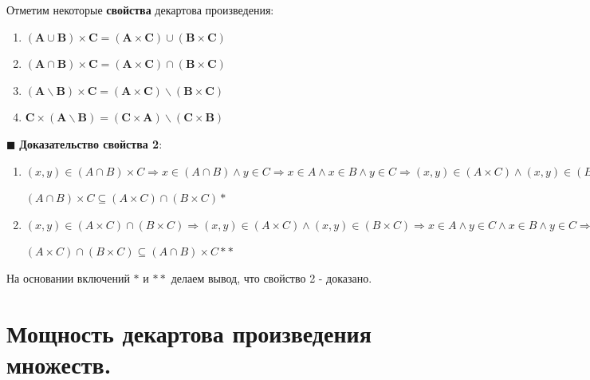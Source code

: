 \documentclass[12pt, a4paper, oneside]{article}
\theoremstyle{plain} %
\theoremstyle{definition}
\begin{document}
Отметим некоторые \textbf{свойства} декартова произведения:

\begin{enumerate}
    
    \item \((\textbf{A} \cup \textbf{B}) \times \textbf{C} = (\textbf{A} \times \textbf{C}) \cup (\textbf{B} \times \textbf{C})\)
    
    \item \((\textbf{A} \cap \textbf{B}) \times \textbf{C} = (\textbf{A} \times \textbf{C}) \cap (\textbf{B} \times \textbf{C})\)
    
    \item \((\textbf{A} \backslash \textbf{B}) \times \textbf{C} = (\textbf{A} \times \textbf{C}) \backslash (\textbf{B} \times \textbf{C})\)
    
    \item \(\textbf{C} \times  (\textbf{A} \backslash \textbf{B}) = (\textbf{C} \times \textbf{A}) \backslash (\textbf{C} \times \textbf{B})\)
    
\end{enumerate}


\(\blacksquare\) \textbf{Доказательство свойства 2}:
\begin{enumerate}
    
\item \((x, y) \in (A \cap B) \times C \Longrightarrow x \in (A \cap B) \wedge y \in C \Longrightarrow x \in A \wedge x \in B \wedge y \in C \Longrightarrow (x, y) \in (A \times C) \wedge (x, y) \in (B \times C) \Longrightarrow (x, y) \in (A \times C) \cap (B \times C).\) 


\((A  \cap B) \times C  \subseteq (A \times C) \cap (B \times C) \ast\) 

\item \((x, y) \in (A \times C) \cap (B \times C) \Longrightarrow (x, y) \in (A \times C) \wedge (x, y) \in (B \times C) \Longrightarrow x \in A \wedge y \in C \wedge x \in B \wedge y \in C \Longrightarrow x \in (A \cap B) \wedge y \in C \Longrightarrow (x, y) \in (A  \cap B) \times C.\) 


\((A \times C) \cap (B \times C) \subseteq (A  \cap B) \times C  \ast \ast \) 

\end{enumerate}

На основании включений \(\ast\)  и \(\ast \ast\)  делаем вывод, что свойство 2 - доказано. 

\section{Мощность декартова произведения множеств.}
\end{document}
